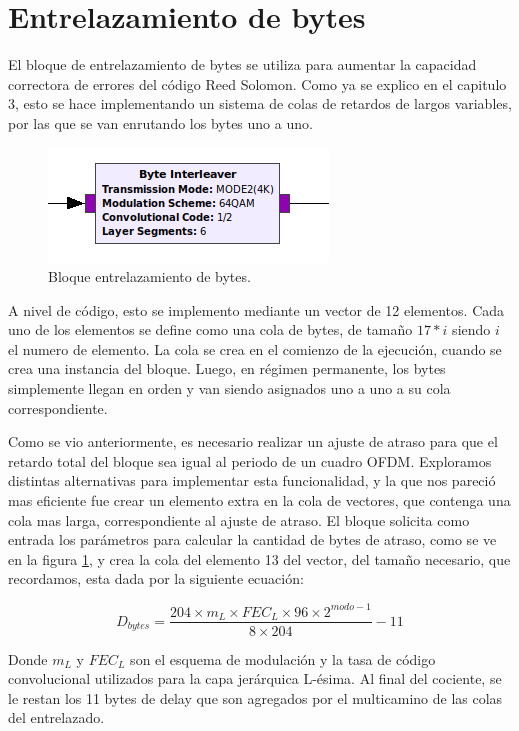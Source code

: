 \section{Entrelazamiento de bytes}

El bloque de entrelazamiento de bytes se utiliza para aumentar la capacidad correctora de errores del código Reed Solomon. Como ya se explico en el capitulo 3, esto se hace implementando un sistema de colas de retardos de largos variables, por las que se van enrutando los bytes uno a uno. 

\begin{figure}[!h]
	\centering
	\includegraphics[scale=0.6]{figuras/cap05/byteint}
	\caption{\label{f:byteint} Bloque entrelazamiento de bytes.}
\end{figure}

A nivel de código, esto se implemento mediante un vector de 12 elementos. Cada uno de los elementos se define como una cola de bytes, de tamaño $17*i$ siendo $i$ el numero de elemento. La cola se crea en el comienzo de la ejecución, cuando se crea una instancia del bloque. Luego, en régimen permanente, los bytes simplemente llegan en orden y van siendo asignados uno a uno a su cola correspondiente.

Como se vio anteriormente, es necesario realizar un ajuste de atraso para que el retardo total del bloque sea igual al periodo de un cuadro OFDM. Exploramos distintas alternativas para implementar esta funcionalidad, y la que nos pareció mas eficiente fue crear un elemento extra en la cola de vectores, que contenga una cola mas larga, correspondiente al ajuste de atraso. El bloque solicita como entrada los parámetros para calcular la cantidad de bytes de atraso, como se ve en la figura \ref{f:byteint}, y crea la cola del elemento 13 del vector, del tamaño necesario, que recordamos, esta dada por la siguiente ecuación:

\begin{equation}
D_{bytes} = \frac{204\times m_L\times FEC_L \times 96\times2^{modo-1}}{8\times204} - 11
\end{equation}

Donde $m_L$ y $FEC_L$ son el esquema de modulación y la tasa de código convolucional utilizados para la capa jerárquica L-ésima. Al final del cociente, se le restan los 11 bytes de delay que son agregados por el multicamino de las colas del entrelazado.

